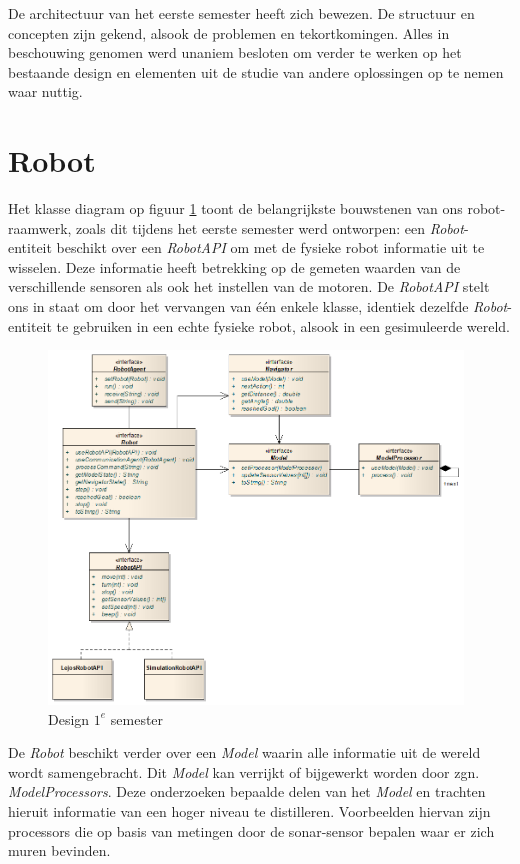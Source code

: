 \documentclass[12pt,a4paper]{report}
\begin{document}
De architectuur van het eerste semester heeft zich bewezen. De structuur en concepten zijn gekend, alsook de problemen en tekortkomingen. Alles in beschouwing genomen werd unaniem besloten om verder te werken op het bestaande design en elementen uit de studie van andere oplossingen op te nemen waar nuttig.

\section{Robot}

Het klasse diagram op figuur \ref{uml:design-semester1} toont de belangrijkste bouwstenen van ons robot-raamwerk, zoals dit tijdens het eerste semester werd ontworpen: een \emph{Robot}-entiteit beschikt over een \emph{RobotAPI} om met de fysieke robot informatie uit te wisselen. Deze informatie heeft betrekking op de gemeten waarden van de verschillende sensoren als ook het instellen van de motoren. De \emph{RobotAPI} stelt ons in staat om door het vervangen van \'e\'en enkele klasse, identiek dezelfde \emph{Robot}-entiteit te gebruiken in een echte fysieke robot, alsook in een gesimuleerde wereld.

\begin{figure}[htbp]
  \centering
  \includegraphics[width=110mm]{resources/design-semester1.png}
  \caption{Design $1^e$ semester}
  \label{uml:design-semester1}
\end{figure}

De \emph{Robot} beschikt verder over een \emph{Model} waarin alle informatie uit de wereld wordt samengebracht. Dit \emph{Model} kan verrijkt of bijgewerkt worden door zgn. \emph{ModelProcessors}. Deze onderzoeken bepaalde delen van het \emph{Model} en trachten hieruit informatie van een hoger niveau te distilleren. Voorbeelden hiervan zijn processors die op basis van metingen door de sonar-sensor bepalen waar er zich muren bevinden.
\end{document}
